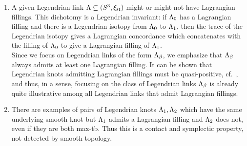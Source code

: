 \begin{enumerate}
    \item A given Legendrian link $\Lambda\subseteq(S^3,\xi_{\text{st}})$ might or might not have Lagrangian fillings. This dichotomy is a Legendrian invariant: if $\Lambda_0$ has a Lagrangian filling and there is a Legendrian isotopy from $\Lambda_0$ to $\Lambda_1$, then the trace of the Legendrian isotopy gives a Lagrangian concordance which concatenates with the filling of $\Lambda_0$ to give a Lagrangian filling of $\Lambda_1$.\\
    
    \noindent Since we focus on Legendrian links of the form $\Lambda_\beta$, we emphasize that $\Lambda_\beta$ always admits at least one Lagrangian filling. It can be shown that Legendrian knots admitting Lagrangian fillings must be quasi-positive, cf.~\cite{HaydenSabloff2015}, and thus, in a sense, focusing on the class of Legendrian links $\Lambda_\beta$ is already quite illustrative among all Legendrian links that admit Lagrangian fillings.\\
    
    \item There are examples of pairs of Legendrian knots $\Lambda_1,\Lambda_2$ which have the same underlying smooth knot but $\Lambda_1$ admits a Lagrangian filling and $\Lambda_2$ does not, even if they are both max-tb. Thus this is a contact and symplectic property, not detected by smooth topology.\\


\end{enumerate}
